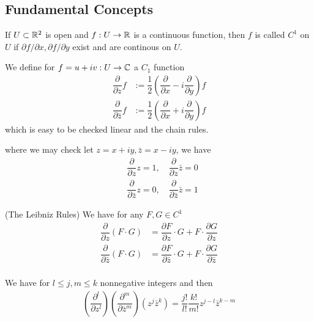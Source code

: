 \chapter{}
\section*{Fundamental Concepts}

\begin{definition}
If $U\subset \mathbb{R}^2$ is open and $f:U\to\mathbb{R}$ is a continuous function, then $f$ is called $C^1$ on $U$ if $\partial f/\partial x, \partial f/\partial y$ exist and are continous on $U$.
\end{definition}

\begin{definition}
    We define for $f = u+iv:U\to \mathbb{C}$ a $C_1$ function
    \[
    \begin{aligned}
    \dfrac{\partial}{\partial z}f &:=\dfrac{1}{2}(\dfrac{\partial}{\partial x} - i\dfrac{\partial}{\partial y})f \\
    \dfrac{\partial}{\partial \bar{z}}f &:=\dfrac{1}{2}(\dfrac{\partial}{\partial x} + i\dfrac{\partial}{\partial y})f
    \end{aligned}
    \]
    which is easy to be checked linear and the chain rules.
\end{definition}
where we may check let $z = x+iy, \bar{z} = x-iy$, we have
\[
\begin{aligned}
    &\dfrac{\partial}{\partial z} z = 1,\quad \dfrac{\partial}{\partial z}\bar{z} = 0 \\
    &\dfrac{\partial}{\partial \bar{z}} z = 0,\quad \dfrac{\partial}{\partial \bar{z}}\bar{z} = 1
\end{aligned}
\]

\begin{proposition}
(The Leibniz Rules) We have for any $F,G \in C^1$
\[
\begin{aligned}
\dfrac{\partial}{\partial z}(F\cdot G) &= \dfrac{\partial F}{\partial z}\cdot G + F\cdot \dfrac{\partial G}{\partial z} \\ 
\dfrac{\partial}{\partial \bar{z}}(F\cdot G) &= \dfrac{\partial F}{\partial \bar{z}}\cdot G + F\cdot \dfrac{\partial G}{\partial \bar{z}} \\ 
\end{aligned}
\]
\end{proposition}

\begin{proposition}
    We have for $l\leq j, m\leq k$ nonnegative integers and then
    \[
    \begin{aligned}
    (\dfrac{\partial^l}{\partial z^l})(\dfrac{\partial^m}{\partial \bar{z}^m})(z^j\bar{z}^k) = \dfrac{j!}{l!}\dfrac{k!}{m!}z^{j-l}\bar{z}^{k-m}
    \end{aligned}
    \]
\end{proposition}

